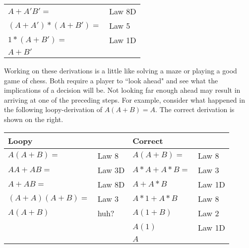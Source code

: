 \begin{tabular}[ht]{ll}
$A + A'B' =$        & Law 8D \\
$(A+A')*(A+B')=$    & Law 5 \\
$1*(A+B')=$         & Law 1D \\
$A+B'$ \\
\end{tabular}

Working on these derivations is a little like solving a maze or playing
a good game of chess.  Both require a player to ``look ahead" and see what the
implications of a decision will be.  Not looking far enough ahead may
result in arriving at one of the preceding steps.  For example, consider what
happened in the following loopy-derivation of $A(A+B)=A$.  The correct
derivation is shown on the right.

\begin{tabular}[ht]{ll|ll}
Loopy        &        & Correct    &        \\ \hline
$A(A+B)=$     & Law 8    & $A(A+B)=$ & Law 8    \\
$AA + AB=$     & Law 3D    & $A*A+A*B=$& Law 3    \\
$A+AB=$    & Law 8D    & $A+A*B$     & Law 1D    \\
$(A+A)(A+B)=$& Law 3    & $A*1+A*B$    & Law 8    \\
$A(A+B)$    & huh?    & $A(1+B)$    & Law 2    \\
&        & $A(1)$    & Law 1D    \\
&        & $A$        & \\
\end{tabular}

